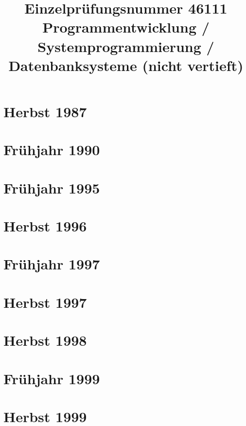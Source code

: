 \documentclass{lehramt-informatik-examen-sammlung}
\title{Einzelprüfungsnummer 46111\\Programmentwicklung / Systemprogrammierung / Datenbanksysteme (nicht vertieft)}
\begin{document}
\maketitle
\tableofcontents

\section{Herbst 1987}


\section{Frühjahr 1990}


\section{Frühjahr 1995}


\section{Herbst 1996}


\section{Frühjahr 1997}


\section{Herbst 1997}


\section{Herbst 1998}


\section{Frühjahr 1999}


\section{Herbst 1999}

\end{document}
